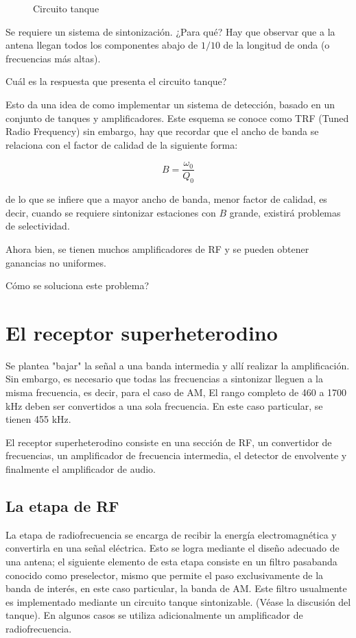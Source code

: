 \documentclass[12pt,letterpaper,titlepage,twoside]{book}
\begin{document}
\begin{figure}

\caption{Circuito tanque} \label{fig:tank}
\end{figure}

Se requiere un sistema de sintonización. ¿Para qué? Hay que observar que a la antena llegan todos los componentes abajo de $1/10$ de la longitud de onda (o frecuencias más altas).

Cuál es la respuesta que presenta el circuito tanque?

Esto da una idea de como implementar un sistema de detección, basado en un conjunto de tanques y amplificadores. Este esquema se conoce como TRF (Tuned Radio Frequency) sin embargo, hay que recordar que el ancho de banda se relaciona con  el factor de calidad de la siguiente forma: 

\begin{equation}
B = \frac{\omega_0}{Q_0}
\end{equation}

de lo que se infiere que a mayor ancho de banda, menor factor de calidad, es decir, cuando se requiere sintonizar estaciones con $B$ grande, existirá problemas de selectividad.

Ahora bien, se tienen muchos amplificadores de RF y se pueden obtener ganancias no uniformes.

Cómo se soluciona este problema?


\section{El receptor superheterodino}



Se plantea "bajar" la señal a una banda intermedia y allí realizar la amplificación. Sin embargo, es necesario que todas las frecuencias a sintonizar lleguen a la misma frecuencia, es decir, para el caso de AM, El rango completo de 460 a 1700 kHz deben ser convertidos a una sola frecuencia. En este caso particular, se tienen 455 kHz.  

El receptor superheterodino consiste en una sección de RF, un convertidor de frecuencias, un amplificador de frecuencia intermedia, el detector de envolvente y finalmente el amplificador de audio.

\subsection{La etapa de RF}
La etapa de radiofrecuencia se encarga de recibir la energía electromagnética y convertirla en una señal eléctrica. Esto se logra mediante el diseño adecuado de una antena; el siguiente elemento de esta etapa consiste en un filtro pasabanda conocido como preselector, mismo que permite el paso exclusivamente de la banda de interés, en este caso particular, la banda de AM. Este filtro usualmente es implementado mediante un circuito tanque sintonizable. (Véase la discusión del tanque). En algunos casos se utiliza adicionalmente un amplificador de radiofrecuencia. 
\end{document}
